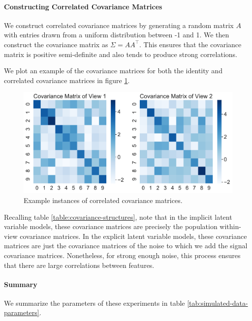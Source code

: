 \paragraph{Constructing Correlated Covariance Matrices}

We construct correlated covariance matrices by generating a random matrix $A$ with entries drawn from a uniform distribution between -1 and 1. We then construct the covariance matrix as $\Sigma = AA^\top$. This ensures that the covariance matrix is positive semi-definite and also tends to produce strong correlations.

We plot an example of the covariance matrices for both the identity and correlated covariance matrices in figure \ref{fig:covariance-matrices}.

\begin{figure}
    \centering
    \includegraphics[width=0.8\linewidth]{figures/simulated/True_Covariance_Correlated_Covariance_implicit.pdf}
    \caption{Example instances of correlated covariance matrices.}\label{fig:covariance-matrices}
\end{figure}

Recalling table \ref{table:covariance-structures}, note that in the implicit latent variable models, these covariance matrices are precisely the population within-view covariance matrices.
In the explicit latent variable models, these covariance matrices are just the covariance matrices of the noise to which we add the signal covariance matrices. Nonetheless, for strong enough noise, this process ensures that there are large correlations between features.

\paragraph{Summary} We summarize the parameters of these experiments in table \ref{tab:simulated-data-parameters}.

